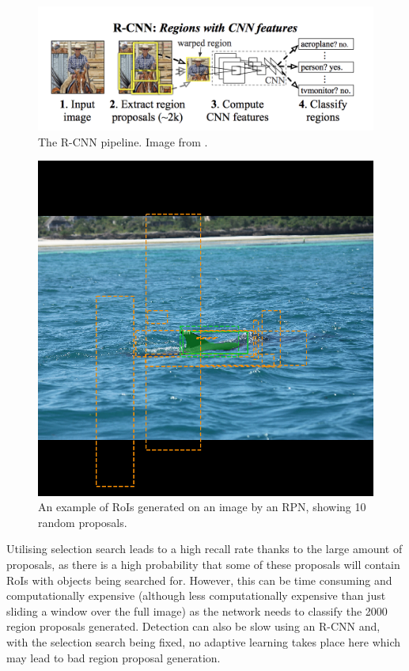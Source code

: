 \begin{figure}[b]
	\begin{center}
		\includegraphics[scale=0.3]{Chapter2/figs/r-cnn.png}
	\end{center}
	\caption{The R-CNN pipeline. Image from \cite{girshick_rich_2014}.}
	\label{fig:r-cnn}
\end{figure}

\begin{figure}
	\begin{center}
		\includegraphics[scale=0.3]{Chapter2/figs/rpn-ten-random-orange.png}
	\end{center}
	\caption{An example of RoIs generated on an image by an RPN, showing 10 random proposals.}
	\label{fig:rpn-randoms}
\end{figure}

Utilising selection search leads to a high recall rate thanks to the large amount of proposals, as there is a high probability that some of these proposals will contain RoIs with objects being searched for. However, this can be time consuming and computationally expensive (although less computationally expensive than just sliding a window over the full image) as the network needs to classify the 2000 region proposals generated. Detection can also be slow using an R-CNN and, with the selection search being fixed, no adaptive learning takes place here which may lead to bad region proposal generation. 

